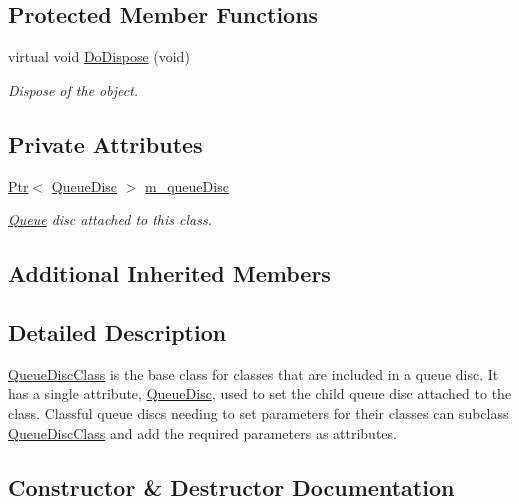 \subsection*{Protected Member Functions}
\begin{DoxyCompactItemize}
\item 
virtual void \hyperlink{classns3_1_1QueueDiscClass_aced6bc8d1184db7ea41d941af24d57f4}{Do\+Dispose} (void)
\begin{DoxyCompactList}\small\item\em Dispose of the object. \end{DoxyCompactList}\end{DoxyCompactItemize}
\subsection*{Private Attributes}
\begin{DoxyCompactItemize}
\item 
\hyperlink{classns3_1_1Ptr}{Ptr}$<$ \hyperlink{classns3_1_1QueueDisc}{Queue\+Disc} $>$ \hyperlink{classns3_1_1QueueDiscClass_af64dcbcca42cf3e54f638864aa03e5cb}{m\+\_\+queue\+Disc}
\begin{DoxyCompactList}\small\item\em \hyperlink{classns3_1_1Queue}{Queue} disc attached to this class. \end{DoxyCompactList}\end{DoxyCompactItemize}
\subsection*{Additional Inherited Members}


\subsection{Detailed Description}
\hyperlink{classns3_1_1QueueDiscClass}{Queue\+Disc\+Class} is the base class for classes that are included in a queue disc. It has a single attribute, \hyperlink{classns3_1_1QueueDisc}{Queue\+Disc}, used to set the child queue disc attached to the class. Classful queue discs needing to set parameters for their classes can subclass \hyperlink{classns3_1_1QueueDiscClass}{Queue\+Disc\+Class} and add the required parameters as attributes. 

\subsection{Constructor \& Destructor Documentation}
